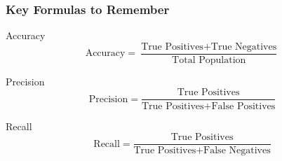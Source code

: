 \documentclass[aspectratio=169]{beamer}
\begin{document}
\begin{frame}[fragile]
    \frametitle{Key Formulas to Remember}

    \begin{block}{Accuracy}
        \begin{equation}
        \text{Accuracy} = \frac{\text{True Positives} + \text{True Negatives}}{\text{Total Population}}
        \end{equation}
    \end{block}
    
    \begin{block}{Precision}
        \begin{equation}
        \text{Precision} = \frac{\text{True Positives}}{\text{True Positives} + \text{False Positives}}
        \end{equation}
    \end{block}
    
    \begin{block}{Recall}
        \begin{equation}
        \text{Recall} = \frac{\text{True Positives}}{\text{True Positives} + \text{False Negatives}}
        \end{equation}
    \end{block}
\end{frame}
\end{document}
